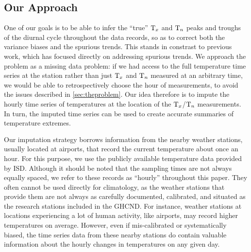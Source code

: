 \documentclass[12pt]{article}
\begin{document}
    


\subsection{Our Approach}\label{sec:approach}
    
One of our goals is to be able to infer the ``true'' \(\mathrm{T}_{x}\) and \(\mathrm{T}_{n}\) peaks and troughs of the diurnal cycle throughout the data records, so as to correct both the variance biases and the spurious trends.
This stands in constrast to previous work, which has focused directly on addressing spurious trends.
We approach the problem as a missing data problem: 
if we had access to the full temperature time series at the station rather than just \(\mathrm{T}_{x}\) and \(\mathrm{T}_{n}\) measured at an arbitrary time, 
we would be able to retrospectively choose the hour of measurements, to avoid the issues described in \autoref{sec:theproblem}.
Our idea therefore is to impute the hourly time series of temperatures
at the location of the \(\mathrm{T}_{x}\)/\(\mathrm{T}_{n}\) measurements.
In turn, the imputed time series can be used to create accurate summaries of temperature extremes.

Our imputation strategy borrows information from the nearby weather stations, usually located at airports, that record the current temperature about once an hour.
For this purpose, we use the publicly available temperature data provided by ISD.
Although it should be noted that the sampling times are not always equally spaced, we refer to these records as ``hourly'' throughout this paper.
They often cannot be used directly for climatology, as the weather stations that provide them are not always as carefully documented, calibrated, and situated as the research stations included in the GHCND. 
For instance, weather stations at locations experiencing a lot of human activity, like airports, may record higher temperatures on average.
However, even if mis-calibrated or systematically biased, the time series data from these nearby stations do contain valuable information about the hourly changes in temperatures on any given day.
\end{document}
